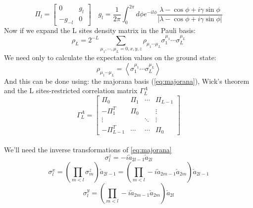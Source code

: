 \documentclass[12pt,a4paper]{book}
\theoremstyle{definition}
\begin{document}
\begin{equation}\label{eq:corrmatr3}
	\Pi_{l}=\left[\begin{array}{cc}
		0 & g_{l} \\
		-g_{-l} & 0
	\end{array}\right] 
	\quad g_{l}=\frac{1}{2 \pi} \int_{0}^{2 \pi} d \phi e^{-i l \phi} \frac{\lambda-\cos \phi+i \gamma \sin \phi}{|\lambda-\cos\phi +i  \gamma\sin \phi|}\end{equation}	 
\newline
Now if we expand the L sites density matrix in the Pauli basis:
\begin{equation}\label{eq:rhoexpansion}\rho_{L}=2^{-L} \sum_{\mu_{1}, \cdots, \mu_{L}=0, x, y, z} \rho_{\mu_{1} \cdots \mu_{L}} \sigma_{1}^{\mu_{1}} \cdots \sigma_{L}^{\mu_{L}}\end{equation}
We need only to calculate the expectation values on the ground state:
\begin{equation}\label{eq:expectation_values}
	\rho_{\mu_{1} \cdots \mu_{L}}=\left\langle\sigma_{1}^{\mu_{1}} \cdots \sigma_{L}^{\mu_{L}}\right\rangle
\end{equation}
And this can be done using: the majorana basis (\ref{eq:majorana}), Wick's theorem and the L sites-restricted correlation matrix $\Gamma^{A}_L$
\begin{equation}\label{eq:corrmatrrestrict}
	\Gamma^{A}_L=\left[\begin{array}{cccc}
		\Pi_{0} & \Pi_{1} & \cdots & \Pi_{L-1} \\
		-\Pi_{1}^T & \Pi_{0} & & \vdots \\
		\vdots & & \ddots & \vdots \\
		-\Pi_{L-1}^T & \cdots & \cdots & \Pi_{0}
	\end{array}\right]\end{equation}\\
We'll need the inverse transformations of \ref{eq:majorana}
\begin{equation}\label{eq:inversez}
	\sigma_{l}^{z} = -i\check{a}_{2l-1} \check{a}_{2 l} 
\end{equation}
\begin{equation}\label{eq:inversex}
	\sigma_{l}^{x}= \left(\prod_{m<l} \sigma_{m}^{z}\right)\check{a}_{2l-1}=
	\left(\prod_{m<l} -i\check{a}_{2m-1} \check{a}_{2 m}\right)\check{a}_{2l-1}
\end{equation}
\begin{equation}\label{eq:inversey}
	\sigma_{l}^{y}=
	\left(\prod_{m<l} -i\check{a}_{2m-1} \check{a}_{2 m}\right)\check{a}_{2l}
\end{equation}
\end{document}
